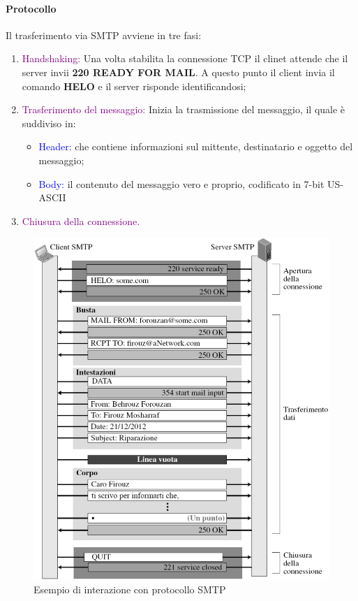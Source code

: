 \paragraph{Protocollo}
Il trasferimento via SMTP avviene in tre fasi:
\begin{enumerate}
    \item \textcolor{purple}{Handshaking:} Una volta stabilita la connessione TCP il clinet attende che il server invii \textbf{220 READY FOR MAIL}. A questo punto il client invia il comando \textbf{HELO} e il server risponde identificandosi;
    \item \textcolor{purple}{Trasferimento del messaggio:} Inizia la trasmissione del messaggio, il quale è suddiviso in:
        \begin{itemize}
            \item \textcolor{blue}{Header:} che contiene informazioni sul mittente, destinatario e oggetto del messaggio;
            \item \textcolor{blue}{Body:} il contenuto del messaggio vero e proprio, codificato in 7-bit US-ASCII
        \end{itemize}
    \item \textcolor{purple}{Chiusura della connessione.}
\end{enumerate}

\begin{figure}[h]
    \centering
    \includegraphics[scale=0.30]{Immagini/Comunicazione_SMTP.png}
    \caption{Esempio di interazione con protocollo SMTP}
\end{figure}

